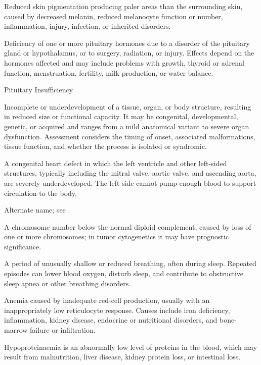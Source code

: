  Reduced skin pigmentation producing paler areas than the surrounding skin, caused by decreased melanin, reduced melanocyte function or number, inflammation, injury, infection, or inherited disorders.

 Deficiency of one or more pituitary hormones due to a disorder of the pituitary gland or hypothalamus, or to surgery, radiation, or injury. Effects depend on the hormones affected and may include problems with growth, thyroid or adrenal function, menstruation, fertility, milk production, or water balance.

\synonyms
Pituitary Insufficiency

 Incomplete or underdevelopment of a tissue, organ, or body structure, resulting in
reduced size or functional capacity. It may be congenital, developmental, genetic, or
acquired and ranges from a mild anatomical variant to severe organ dysfunction.
Assessment considers the timing of onset, associated malformations, tissue function, and whether the process is isolated or syndromic.

 A congenital heart defect in which the left ventricle and other left-sided structures, typically including the mitral valve, aortic valve, and ascending aorta, are severely underdeveloped. The left side cannot pump enough blood to support circulation to the body.

 Alternate name; see .

 A chromosome number below the normal diploid complement, caused by loss of one or more chromosomes; in tumor cytogenetics it may have prognostic significance.

 A period of unusually shallow or reduced breathing, often during sleep. Repeated episodes can lower blood oxygen, disturb sleep, and contribute to obstructive sleep apnea or other breathing disorders.

 Anemia caused by inadequate red-cell production, usually with an inappropriately low reticulocyte response. Causes include iron deficiency, inflammation, kidney disease, endocrine or nutritional disorders, and bone-marrow failure or infiltration.

 Hypoproteinaemia is an abnormally low level of proteins in the blood, which may result from malnutrition, liver disease, kidney protein loss, or intestinal loss.

